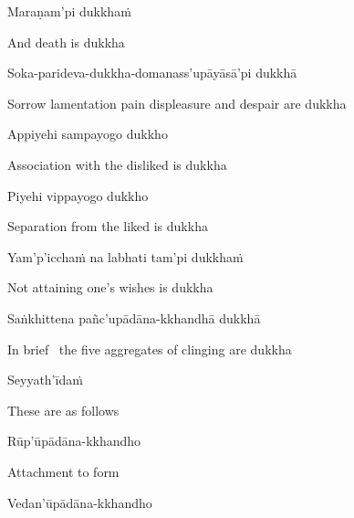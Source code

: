 Maraṇam'pi dukkhaṁ

\begin{english}
  And death is dukkha
\end{english}

Soka-parideva-dukkha-domanass'upāyāsā'pi dukkhā

\begin{english}
  Sorrow lamentation pain displeasure\makeatletter\hyperlink{endnote14-appendix}\makeatother
  and despair are dukkha
\end{english}

Appiyehi sampayogo dukkho

\begin{english}
  Association with the disliked is dukkha
\end{english}

Piyehi vippayogo dukkho

\begin{english}
  Separation from the liked is dukkha
\end{english}

Yam'p'icchaṁ na labhati tam'pi dukkhaṁ

\begin{english}
  Not attaining one's wishes is dukkha
\end{english}

\suttaRef{[SN 56.11]}

Saṅkhittena pañc'upādāna-kkhandhā dukkhā

\begin{english}
  In brief \breathmark\ the five aggregates of clinging are dukkha\makeatletter\hyperlink{endnote15-appendix}\makeatother
\end{english}

Seyyath'īdaṁ

\begin{english}
  These are as follows
\end{english}

Rūp'ūpādāna-kkhandho

\begin{english}
  Attachment to form
\end{english}

Vedan'ūpādāna-kkhandho

